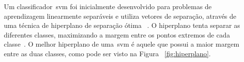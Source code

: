 

Um classificador~\ac{svm} foi inicialmente desenvolvido para problemas de aprendizagem linearmente separáveis e utiliza vetores de separação, através de uma técnica de hiperplano de separação ótima ~\cite{vapnik95}. O hiperplano tenta separar as diferentes classes, maximizando a margem entre os pontos extremos de cada classe~\cite{valt2010}. O melhor hiperplano de uma~\ac{svm} é aquele que possui a maior margem entre as duas classes, como pode ser visto na Figura ~\ref{fig:hiperplano}.  

